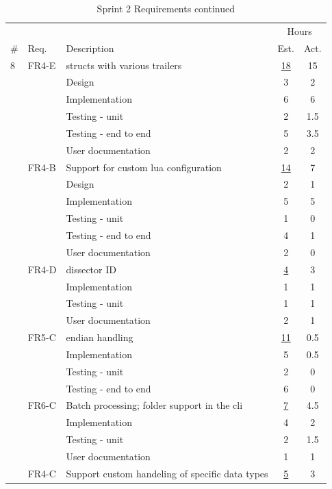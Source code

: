 \begin{table}[!htb] \small \center
\caption{Sprint 2 Requirements continued\label{tab:sprint2req2}}
\begin{tabularx}{\textwidth}{l l X c c}
	\toprule
	& & & \multicolumn{2}{c}{Hours} \\
	\cmidrule(r){4-5}
	\# & Req. & Description & Est. & Act. \\
	\midrule
	8 & FR4-E & \Glspl{struct} with various \gls{trailers} & \underline{ 18 } & 15 \\
	   &  & Design & 3 & 2 \\
	   &  & Implementation & 6 & 6 \\
	   &  & Testing - unit & 2 & 1.5 \\
	   &  & Testing - end to end & 5 & 3.5 \\
	   &  & User documentation & 2 & 2 \\
	\addlinespace
	9 & FR4-B & Support for custom \Gls{lua} configuration & \underline{ 14 } & 7 \\
	   &  & Design & 2 & 1 \\
	   &  & Implementation & 5 & 5 \\
	   &  & Testing - unit & 1 & 0 \\
	   &  & Testing - end to end & 4 & 1 \\
	   &  & User documentation & 2 & 0 \\
	\addlinespace
	10 & FR4-D & \Gls{dissector} ID & \underline{ 4 } & 3 \\
	   &  & Implementation & 1 & 1 \\
	   &  & Testing - unit & 1 & 1 \\
	   &  & User documentation & 2 & 1 \\
	\addlinespace
	11 & FR5-C & \Gls{endian} handling & \underline{ 11 } & 0.5 \\
	   &  & Implementation & 5 & 0.5 \\
	   &  & Testing - unit & 2 & 0 \\
	   &  & Testing - end to end & 6 & 0 \\
	\addlinespace
	12 & FR6-C & Batch processing; folder support in the \gls{cli} & \underline{ 7 } & 4.5 \\
	   &  & Implementation & 4 & 2 \\
	   &  & Testing - unit & 2 & 1.5 \\
	   &  & User documentation & 1 & 1 \\
	\addlinespace
	13 & FR4-C & Support custom handeling of specific data types & \underline{ 5 } & 3 \\

\end{tabularx}
\end{table}
